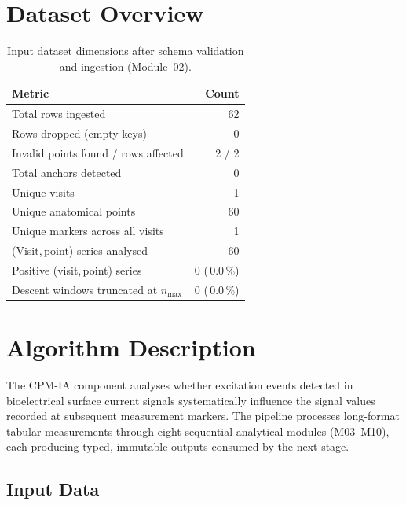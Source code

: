 \documentclass[a4paper,11pt]{article}
\begin{document}
\section{Dataset Overview}

\begin{table}[h!]
\centering
\small
\caption{Input dataset dimensions after schema validation and ingestion (Module~02).}
\begin{tabular}{lr}
\toprule
\textbf{Metric} & \textbf{Count} \\
\midrule
Total rows ingested                        & 62 \\
Rows dropped (empty keys)                  & 0 \\
Invalid points found / rows affected       & 2 / 2 \\
Total anchors detected                     & 0 \\
Unique visits                          & 1 \\
Unique anatomical points               & 60 \\
Unique markers across all visits       & 1 \\
(Visit,\,point) series analysed        & 60 \\
Positive (visit,\,point) series        & 0 (\,0.0\,\%) \\
Descent windows truncated at $n_{\max}$ & 0 (\,0.0\,\%) \\
\bottomrule
\end{tabular}
\end{table}

\section{Algorithm Description}

The CPM-IA component analyses whether excitation events detected in bioelectrical surface
current signals systematically influence the signal values recorded at subsequent measurement
markers. The pipeline processes long-format tabular measurements through eight sequential
analytical modules (M03--M10), each producing typed, immutable outputs consumed by the next
stage.

\subsection{Input Data}
\end{document}

